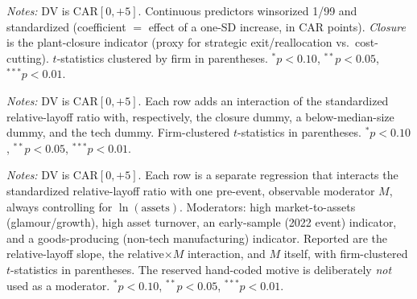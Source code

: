\documentclass[12pt]{article}
\begin{document}
\begin{table}[htbp]\centering
\begin{threeparttable}
\caption{Cross-section of WARN-notice CARs: materiality, not headcount or motive}\label{tab:main}
{\footnotesize\setlength{\tabcolsep}{4pt}
}
\begin{tablenotes}\small\item \textit{Notes:} DV is CAR$[0,+5]$. Continuous
predictors winsorized 1/99 and standardized (coefficient $=$ effect of a one-SD
increase, in CAR points). \emph{Closure} is the plant-closure indicator (proxy for
strategic exit/reallocation vs.\ cost-cutting). $t$-statistics clustered by firm
in parentheses. $^{*}p<0.10$, $^{**}p<0.05$, $^{***}p<0.01$.
\end{tablenotes}
\end{threeparttable}
\end{table}

\begin{table}[htbp]\centering
\begin{threeparttable}
\caption{Heterogeneity: the punishment is a small-firm phenomenon}\label{tab:hetero}\small

\begin{tablenotes}\small\item \textit{Notes:} DV is CAR$[0,+5]$. Each row adds an
interaction of the standardized relative-layoff ratio with, respectively, the
closure dummy, a below-median-size dummy, and the tech dummy. Firm-clustered
$t$-statistics in parentheses. $^{*}p<0.10$, $^{**}p<0.05$, $^{***}p<0.01$.
\end{tablenotes}
\end{threeparttable}
\end{table}

\begin{table}[htbp]\centering
\begin{threeparttable}
\caption{Extended heterogeneity: the materiality effect is not concentrated in any
observable subgroup}\label{tab:heteroext}\small

\begin{tablenotes}\small\item \textit{Notes:} DV is CAR$[0,+5]$. Each row is a
separate regression that interacts the standardized relative-layoff ratio with one
pre-event, observable moderator $M$, always controlling for $\ln(\text{assets})$.
Moderators: high market-to-assets (glamour/growth), high asset turnover, an
early-sample (2022 event) indicator, and a goods-producing (non-tech
manufacturing) indicator. Reported are the relative-layoff slope, the
relative$\times M$ interaction, and $M$ itself, with firm-clustered $t$-statistics
in parentheses. The reserved hand-coded motive is deliberately \emph{not} used as
a moderator. $^{*}p<0.10$, $^{**}p<0.05$, $^{***}p<0.01$.
\end{tablenotes}
\end{threeparttable}
\end{table}
\end{document}
